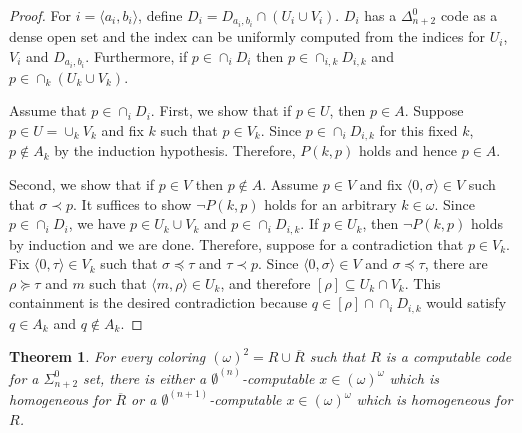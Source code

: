 \documentclass{amsart}
\newtheorem{thm}{Theorem}[section]
\theoremstyle{definition}
\theoremstyle{remark}
\begin{document}
\begin{proof}
For $i = \langle a_i,b_i \rangle$, define $D_i = D_{a_i,b_i} \cap (U_i \cup V_i)$. $D_i$ has a $\Delta^0_{n+2}$ code as a dense open set and the index can be uniformly computed 
from the indices for $U_i$, $V_i$ and $D_{a_i,b_i}$. Furthermore, if $p \in \cap_i D_i$ then $p \in \cap_{i,k} D_{i,k}$ and $p \in \cap_k (U_k \cup V_k)$. 

Assume that $p \in \cap_i D_i$. First, we show that if $p \in U$, then $p \in A$. Suppose $p \in U = \cup_k V_k$ and fix $k$ such that $p \in V_k$. 
Since $p \in \cap_i D_{i,k}$ for this fixed $k$, $p \not \in A_k$ by the induction hypothesis. Therefore, $P(k,p)$ holds and hence $p \in A$. 

Second, we show that if $p \in V$ then $p \not \in A$. Assume $p \in V$ and fix $\langle 0, \sigma \rangle \in V$ such that $\sigma \prec p$. It suffices to show $\neg P(k,p)$ holds 
for an arbitrary $k \in \omega$. Since $p \in \cap_i D_i$, we have $p \in U_k \cup V_k$ and $p \in \cap_i D_{i,k}$. If $p \in U_k$, then $\neg P(k,p)$ holds by induction and we 
are done. Therefore, suppose for a contradiction that $p \in V_k$. Fix $\langle 0, \tau \rangle \in V_k$ such that $\sigma \preceq \tau$ and $\tau \prec p$. 
Since $\langle 0,\sigma \rangle \in V$ and $\sigma \preceq \tau$, there are $\rho \succeq \tau$ and $m$ such that 
$\langle m,\rho \rangle \in U_k$, and therefore $[\rho] \subseteq U_k \cap V_k$. This containment is the desired contradiction because $q \in [\rho] \cap \cap_i D_{i,k}$ would  
satisfy $q \in A_k$ and $q \not \in A_k$.  
\end{proof}


\begin{thm}
\label{thm:lifting}
For every coloring $(\omega)^2 = R\cup \overline{R}$ such that $R$ is a computable code for a 
$\Sigma_{n+2}^0$ set, there is either a $\emptyset^{(n)}$-computable $x \in (\omega)^{\omega}$ which is homogeneous for $\overline{R}$ or a 
$\emptyset^{(n+1)}$-computable $x \in (\omega)^{\omega}$ which is homogeneous for $R$.
\end{thm}
\end{document}
